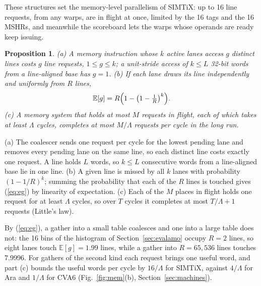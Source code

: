 \documentclass[journal]{IEEEtran}
\newtheorem{proposition}{Proposition}
\begin{document}
These structures set the memory-level parallelism of SIMTiX: up to 16 line requests,
from any warps, are in flight at once, limited by the 16 tags and the 16 MSHRs, and
meanwhile the scoreboard lets the warps whose operands are ready keep issuing.

\begin{proposition}\label{prop:mlp}
(a) A memory instruction whose $k$ active lanes access $g$ distinct lines costs $g$
line requests, $1\le g\le k$; a unit-stride access of $k\le L$ 32-bit words from a
line-aligned base has $g=1$. (b) If each lane draws its line independently and
uniformly from $R$ lines,
\begin{equation}
\mathbb{E}[g]=R\Bigl(1-\bigl(1-\tfrac{1}{R}\bigr)^{k}\Bigr).
\label{eq:eg}
\end{equation}
(c) A memory system that holds at most $M$ requests in flight, each of which takes at
least $\Lambda$ cycles, completes at most $M/\Lambda$ requests per cycle in the long
run.
\end{proposition}
\begin{IEEEproof}
(a) The coalescer sends one request per cycle for the lowest pending lane and removes
every pending lane on the same line, so each distinct line costs exactly one request.
A line holds $L$ words, so $k\le L$ consecutive words from a line-aligned base lie in
one line. (b) A given line is missed by all $k$ lanes with probability
$(1-1/R)^k$; summing the probability that each of the $R$ lines is touched gives
(\ref{eq:eg}) by linearity of expectation. (c) Each of the $M$ places in flight holds
one request for at least $\Lambda$ cycles, so over $T$ cycles it completes at most
$T/\Lambda+1$ requests (Little's law).
\end{IEEEproof}

By (\ref{eq:eg}), a gather into a small table coalesces and one into a large table
does not: the 16 bins of the histogram of Section~\ref{sec:evalamo} occupy $R=2$
lines, so eight lanes touch $\mathbb{E}[g]=1.99$ lines, while a gather into
$R=65{,}536$ lines touches 7.9996. For gathers of the second kind each request brings
one useful word, and part (c) bounds the useful words per cycle by $16/\Lambda$ for
SIMTiX, against $4/\Lambda$ for Ara and $1/\Lambda$ for CVA6
(Fig.~\ref{fig:mem}(b), Section~\ref{sec:machines}).

\end{document}
